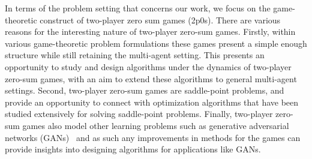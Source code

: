 In terms of the problem setting that concerns our work, we focus on the game-theoretic construct of
two-player zero sum games (2p0s).
There are various reasons for the interesting nature of two-player zero-sum games.
Firstly, within various game-theoretic problem formulations these games present a simple enough
structure while still retaining the multi-agent setting.
This presents an opportunity to study and design algorithms under the dynamics of two-player
zero-sum games, with an aim to extend these algorithms to general multi-agent settings.
Second, two-player zero-sum games are saddle-point problems, and provide an opportunity to connect
with optimization algorithms that have been studied extensively for solving saddle-point problems.
Finally, two-player zero-sum games also model other learning problems such as generative
adversarial networks (GANs)~\cite{goodfellowGenerative2014} and as such any improvements in methods
for the games can provide insights into designing algorithms for applications like GANs.

